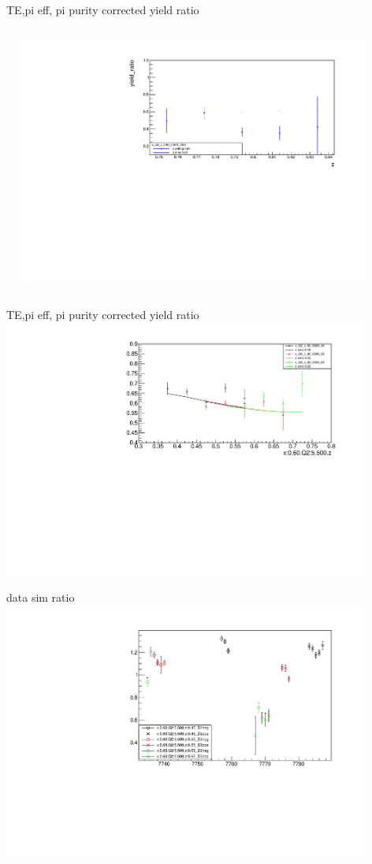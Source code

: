 \begin{frame}{TE,pi eff, pi purity corrected yield ratio}
\begin{columns}
\begin{column}[T]{0.5\textwidth}
\end{column}
\begin{column}[T]{0.5\textwidth}
\includegraphics[width = 0.9\textwidth]{results/yield/statistics_corr/x_Q2_z_60_5500_90_ratio.pdf}
\end{column}
\end{columns}
\end{frame}
\begin{frame}{TE,pi eff, pi purity corrected yield ratio}
\includegraphics[width = 0.9\textwidth]{results/yield/statistics_corr/x_Q2_60_5500_ratio.pdf}
\end{frame}
\begin{frame}{data sim ratio}
    \includegraphics[width = 0.9\textwidth]{results/yield/run_info_pdf/x_Q2_60_5500_data_simc_ratio.pdf}
\end{frame}
